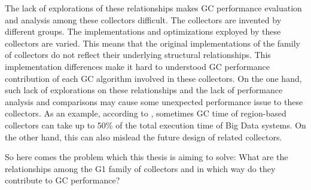 The lack of explorations of these relationships makes GC performance evaluation
and analysis among these collectors difficult.
The collectors are invented by different groups.
The implementations and optimizations exployed by these collectors are varied.
This means that the original implementations of the family of collectors do not reflect
their underlying structural relationships.
This implementation differences make it hard to understood GC performance contribution of each
GC algorithm involved in these collectors.
On the one hand, such lack of explorations on these relationships and the lack of
performance analysis and comparisons may cause some unexpected performance issue to these collectors.
As an example, according to \cite{nguyen2015speculative}, sometimes GC time of region-based collectors
can take up to 50\% of the total execution time of Big Data systems.
On the other hand, this can also mislead the future design of related collectors.

So here comes the problem which this thesis is aiming to solve: What are the relationships
among the G1 family of collectors and in which way do they contribute to GC performance?





